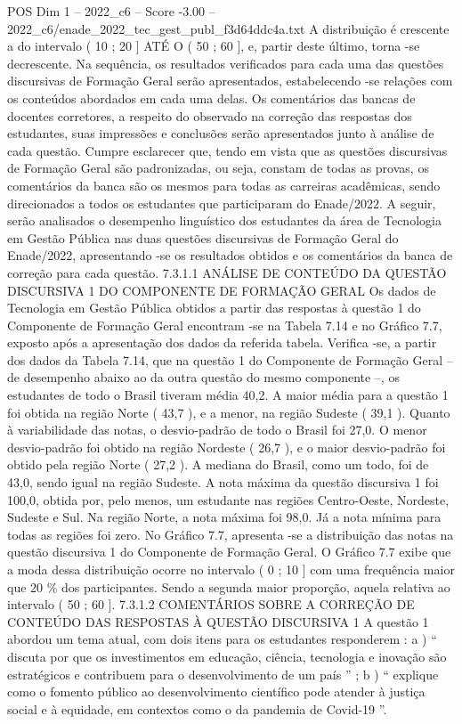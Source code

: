 \begin{textsample}{POS Dim 1 – 2022\_c6 – Score -3.00 – 2022\_c6/enade\_2022\_tec\_gest\_publ\_f3d64ddc4a.txt}
A distribuição é crescente a do intervalo ( 10 ; 20 ] ATÉ O ( 50 ; 60 ], e, partir deste último, torna -se decrescente.
Na sequência, os resultados verificados para cada uma das questões discursivas de Formação Geral serão apresentados, estabelecendo -se relações com os conteúdos abordados em cada uma delas.
Os comentários das bancas de docentes corretores, a respeito do observado na correção das respostas dos estudantes, suas impressões e conclusões serão apresentados junto à análise de cada questão.
Cumpre esclarecer que, tendo em vista que as questões discursivas de Formação Geral são padronizadas, ou seja, constam de todas as provas, os comentários da banca são os mesmos para todas as carreiras acadêmicas, sendo direcionados a todos os estudantes que participaram do Enade/2022.
A seguir, serão analisados o desempenho linguístico dos estudantes da área de Tecnologia em Gestão Pública nas duas questões discursivas de Formação Geral do Enade/2022, apresentando -se os resultados obtidos e os comentários da banca de correção para cada questão. 7.3.1.1 ANÁLISE DE CONTEÚDO DA QUESTÃO DISCURSIVA 1 DO COMPONENTE DE FORMAÇÃO GERAL Os dados de Tecnologia em Gestão Pública obtidos a partir das respostas à questão 1 do Componente de Formação Geral encontram -se na Tabela 7.14 e no Gráfico 7.7, exposto após a apresentação dos dados da referida tabela.
Verifica -se, a partir dos dados da Tabela 7.14, que na questão 1 do Componente de Formação Geral – de desempenho abaixo ao da outra questão do mesmo componente –, os estudantes de todo o Brasil tiveram média 40,2.
A maior média para a questão 1 foi obtida na região Norte ( 43,7 ), e a menor, na região Sudeste ( 39,1 ).
Quanto à variabilidade das notas, o desvio-padrão de todo o Brasil foi 27,0.
O menor desvio-padrão foi obtido na região Nordeste ( 26,7 ), e o maior desvio-padrão foi obtido pela região Norte ( 27,2 ).
A mediana do Brasil, como um todo, foi de 43,0, sendo igual na região Sudeste.
A nota máxima da questão discursiva 1 foi 100,0, obtida por, pelo menos, um estudante nas regiões Centro-Oeste, Nordeste, Sudeste e Sul.
Na região Norte, a nota máxima foi 98,0.
Já a nota mínima para todas as regiões foi zero.
No Gráfico 7.7, apresenta -se a distribuição das notas na questão discursiva 1 do Componente de Formação Geral.
O Gráfico 7.7 exibe que a moda dessa distribuição ocorre no intervalo ( 0 ; 10 ] com uma frequência maior que 20 \% dos participantes.
Sendo a segunda maior proporção, aquela relativa ao intervalo ( 50 ; 60 ]. 7.3.1.2 COMENTÁRIOS SOBRE A CORREÇÃO DE CONTEÚDO DAS RESPOSTAS À QUESTÃO DISCURSIVA 1 A questão 1 abordou um tema atual, com dois itens para os estudantes responderem : a ) “ discuta por que os investimentos em educação, ciência, tecnologia e inovação são estratégicos e contribuem para o desenvolvimento de um país ” ; b ) “ explique como o fomento público ao desenvolvimento científico pode atender à justiça social e à equidade, em contextos como o da pandemia de Covid-19 ”.

\end{textsample}
